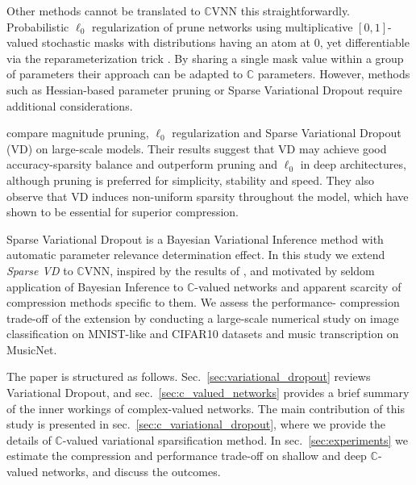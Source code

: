 \documentclass[a4paper,10pt,twocolumn]{article}
\newcommand{\cplx}{\mathbb{C}}
\begin{document}
Other methods cannot be translated to $\cplx$VNN this straightforwardly. Probabilistic
$\ell_0$ regularization of \citet{louizos_learning_2018} prune networks using multiplicative
$[0, 1]$-valued stochastic masks with distributions having an atom at $0$, yet differentiable
via the reparameterization trick \citep{kingma_auto-encoding_2014}. By sharing a single mask
value within a group of parameters their approach can be adapted to $\cplx$ parameters.
However, methods such as Hessian-based parameter pruning \citep{lecun_optimal_1990}
or Sparse Variational Dropout \citep{molchanov_variational_2017} require additional
considerations.

\citet{gale_state_2019} compare magnitude pruning, $\ell_0$ regularization and Sparse
Variational Dropout (VD) on large-scale models. Their results suggest that VD may achieve
good accuracy-sparsity balance and outperform pruning and $\ell_0$ in deep architectures,
although pruning is preferred for simplicity, stability and speed. They also observe that
VD induces non-uniform sparsity throughout the model, which \citet{he_amc:_2018} have shown
to be essential for superior compression.

Sparse Variational Dropout is a Bayesian Variational Inference method with automatic
parameter relevance determination effect. In this study we extend \emph{Sparse VD} to
$\cplx$VNN, inspired by the results of \citet{gale_state_2019}, and motivated by seldom
application of Bayesian Inference to $\cplx$-valued networks \citep{popa_complex-valued_2017}
and apparent scarcity of compression methods specific to them. We assess the performance-%
compression trade-off of the extension by conducting a large-scale numerical study on
image classification on MNIST-like and CIFAR10 datasets and music transcription on MusicNet.

The paper is structured as follows. Sec.~\ref{sec:variational_dropout} reviews Variational
Dropout, and sec.~\ref{sec:c_valued_networks} provides a brief summary of the inner
workings of complex-valued networks. The main contribution of this study is presented
in sec.~\ref{sec:c_variational_dropout}, where we provide the details of $\cplx$-valued
variational sparsification method. In sec.~\ref{sec:experiments} we estimate the compression
and performance trade-off on shallow and deep $\cplx$-valued networks, and discuss the
outcomes.
\end{document}
